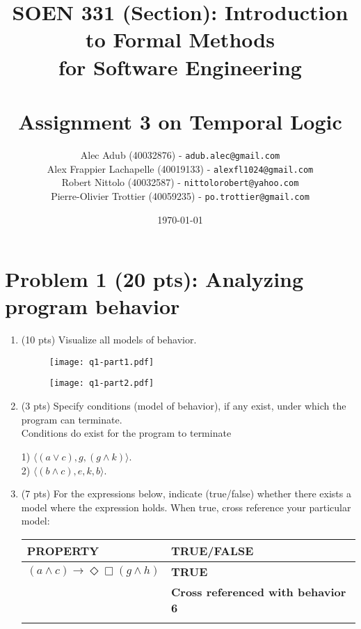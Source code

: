 \documentclass[12pt]{article}
\title{SOEN 331 (Section): Introduction to Formal Methods\\for Software Engineering\\
\ \\
Assignment 3 on Temporal Logic}
\author{\begin{tabular}{c}
Alec Adub (40032876) - \texttt{adub.alec@gmail.com} \tabularnewline
Alex Frappier Lachapelle (40019133) - \texttt{alexfl1024@gmail.com} \tabularnewline
Robert Nittolo (40032587) - \texttt{nittolorobert@yahoo.com} \tabularnewline
Pierre-Olivier Trottier (40059235) - \texttt{po.trottier@gmail.com} \tabularnewline\\
\end{tabular}
}
\date{\today}
\begin{document}
\maketitle

\newpage

\section*{Problem 1 (20 pts):  Analyzing program behavior}

\begin{enumerate}

\item (10 pts) Visualize all models of behavior.

\begin{figure}[h!]
  \centering
  \texttt{[image: q1-part1.pdf]}
\end{figure}

\newpage

\begin{figure}[h!]
  \centering
  \texttt{[image: q1-part2.pdf]}
\end{figure}

\item (3 pts) Specify conditions (model of behavior), if any exist, under which the program can terminate.
\\
Conditions do exist for the program to terminate 

1)
$\langle(a\vee c),g,(g\wedge k)\rangle.$	
\\
2)
$\langle(b\wedge c),e,k,b\rangle.$	



\item (7 pts) For the expressions below, indicate (true/false) whether there exists a 
model where the expression holds. When true, cross reference your particular model:

\begin{table}\small
\centering
\begin{tabular}{|l|l|}
\hline
\textbf{PROPERTY}							& \textbf{TRUE/FALSE}\\
\hline

$(a \wedge c) \rightarrow \Diamond \Box (g \wedge h)$	
 &\textbf{TRUE}\\
 &\textbf{Cross referenced with behavior 6}\\
&\\

\hline



\end{tabular}
\end{table}
\end{enumerate}
\end{document}
